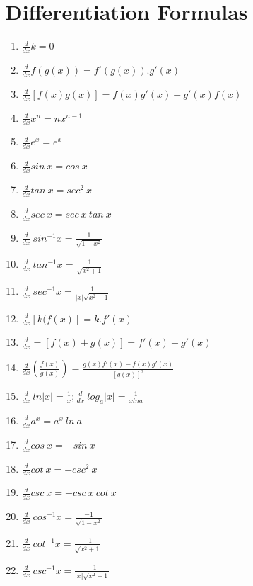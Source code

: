 \section{Differentiation Formulas}
\begin{multicols}{2}
\begin{enumerate}
    \item \(\frac{d}{dx}k=0\)
    \item \(\frac{d}{dx}f(g(x))=f'(g(x)).g'(x)\)
    \item \(\frac{d}{dx}[f(x)g(x)]=f(x)g'(x)+g'(x)f(x)\) %
    \item \(\frac{d}{dx}x^n=nx^{n-1}\)
    \item \(\frac{d}{dx}e^x=e^x\)
    \item \(\frac{d}{dx}sin\ x=cos\ x\)
    \item \(\frac{d}{dx}tan\ x=sec^2\ x\)
    \item \(\frac{d}{dx}sec\ x=sec\ x\ tan\ x\)
    \item \(\frac{d}{dx}\ sin^{-1}x=\frac{1}{\sqrt{1-x^2}}\)
    \item \(\frac{d}{dx}\ tan^{-1}x=\frac{1}{\sqrt{x^2+1}}\)
    \item \(\frac{d}{dx}\ sec^{-1}x=\frac{1}{|x|\sqrt{x^2-1}}\)
    \item \(\frac{d}{dx}[k(f(x)]=k.f'(x)\) %
    \item \(\frac{d}{dx}=[f(x)\pm g(x)]=f'(x)\pm g'(x)\) %
    \item \(\frac{d}{dx}\left(\frac{f(x)}{g(x)}\right)=\frac{g(x)f'(x)-f(x)g'(x)}{[g(x)]^2}\)
    \item \(\frac{d}{dx}\ ln|x|=\frac{1}{x}; \frac{d}{dx}\ log_a|x|=\frac{1}{x ln a} \)
    \item \(\frac{d}{dx}a^x=a^x\ ln\ a\)
    \item \(\frac{d}{dx}cos\ x=-sin\ x\)
    \item \(\frac{d}{dx}cot\ x=-csc^2\ x\)
    \item \(\frac{d}{dx}csc\ x=-csc\ x\ cot\ x\)
    \item \(\frac{d}{dx}\ cos^{-1}x=\frac{-1}{\sqrt{1-x^2}}\)
    \item \(\frac{d}{dx}\ cot^{-1}x=\frac{-1}{\sqrt{x^2+1}}\)
    \item \(\frac{d}{dx}\ csc^{-1}x=\frac{-1}{|x|\sqrt{x^2-1}}\)
\end{enumerate}
\end{multicols}


